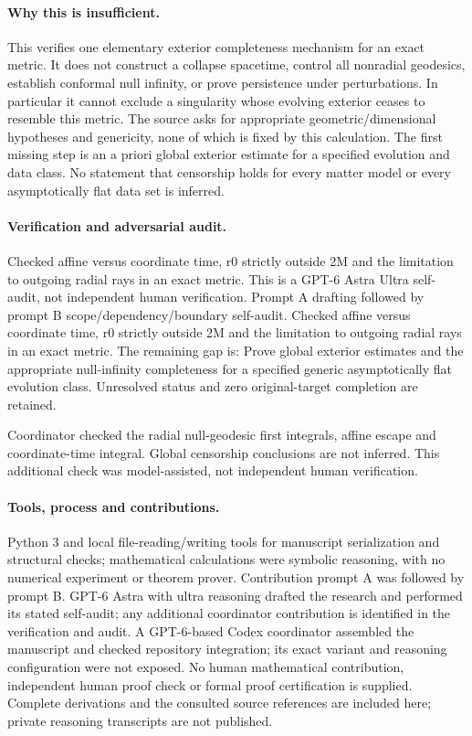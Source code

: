 \documentclass[11pt]{article}
\begin{document}
\paragraph{Why this is insufficient.} This verifies one elementary exterior completeness mechanism for an exact metric. It does not construct a collapse spacetime, control all nonradial geodesics, establish conformal null infinity, or prove persistence under perturbations. In particular it cannot exclude a singularity whose evolving exterior ceases to resemble this metric. The source asks for appropriate geometric/dimensional hypotheses and genericity, none of which is fixed by this calculation. The first missing step is an a priori global exterior estimate for a specified evolution and data class. No statement that censorship holds for every matter model or every asymptotically flat data set is inferred.

\paragraph{Verification and adversarial audit.}
Checked affine versus coordinate time, r0 strictly outside 2M and the limitation to outgoing radial rays in an exact metric. This is a GPT-6 Astra Ultra self-audit, not independent human verification. Prompt A drafting followed by prompt B scope/dependency/boundary self-audit. Checked affine versus coordinate time, r0 strictly outside 2M and the limitation to outgoing radial rays in an exact metric. The remaining gap is: Prove global exterior estimates and the appropriate null-infinity completeness for a specified generic asymptotically flat evolution class. Unresolved status and zero original-target completion are retained.

Coordinator checked the radial null-geodesic first integrals, affine escape and coordinate-time integral. Global censorship conclusions are not inferred. This additional check was model-assisted, not independent human verification.

\paragraph{Tools, process and contributions.}
Python 3 and local file-reading/writing tools for manuscript serialization and structural checks; mathematical calculations were symbolic reasoning, with no numerical experiment or theorem prover. Contribution prompt A was followed by prompt B. GPT-6 Astra with ultra reasoning drafted the research and performed its stated self-audit; any additional coordinator contribution is identified in the verification and audit. A GPT-6-based Codex coordinator assembled the manuscript and checked repository integration; its exact variant and reasoning configuration were not exposed. No human mathematical contribution, independent human proof check or formal proof certification is supplied. Complete derivations and the consulted source references are included here; private reasoning transcripts are not published.
\end{document}
